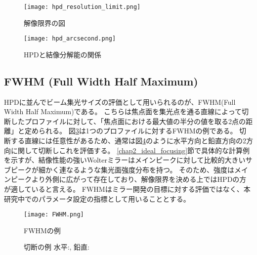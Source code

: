 \begin{figure}[ht]
\centering
\texttt{[image: hpd\_resolution\_limit.png]}
\caption{解像限界の図}
\label{fig:hpd_resolution_limit}
\end{figure}

\begin{figure}[ht]
\centering
\texttt{[image: hpd\_arcsecond.png]}
\caption{HPDと結像分解能の関係}
\label{fig:hpd_arcsecond}
\end{figure}


\subsection{FWHM (Full Width Half Maximum)}
\label{chap2_fwhm}

HPDに並んでビーム集光サイズの評価として用いられるのが、FWHM(Full Width Half Maximum)である。
こちらは焦点面を集光点を通る直線によって切断したプロファイルに対して、「焦点面における最大値の半分の値を取る2点の距離」と定められる。
図\ref{fig:fwhm_explanation_profile}は1つのプロファイルに対するFWHMの例である。
切断する直線には任意性があるため、通常は図\ref{fig:fwhm_explanation}のように水平方向と鉛直方向の2方向に関して切断しこれを評価する。
\ref{chap2_ideal_focusing}節で具体的な計算例を示すが、結像性能の強いWolterミラーはメインピークに対して比較的大きいサブピークが細かく連なるような集光面強度分布を持つ。
そのため、強度はメインピークより外側に広がって存在しており、解像限界を決める上ではHPDの方が適していると言える。
FWHMはミラー開発の目標に対する評価ではなく、本研究中でのパラメータ設定の指標として用いることとする。

\begin{figure}[ht]
\centering
\texttt{[image: FWHM.png]}
\caption{FWHMの例}
\label{fig:fwhm_explanation_profile}
\end{figure}

\begin{figure}[!ht]
\centering

\caption[]{切断の例 水平:, 鉛直:}
\label{fig:fwhm_explanation}
\end{figure}


\clearpage
\newpage

